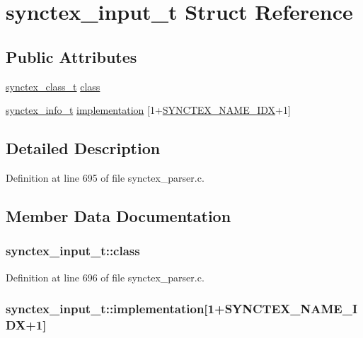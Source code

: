 \hypertarget{structsynctex__input__t}{\section{synctex\+\_\+input\+\_\+t Struct Reference}
\label{structsynctex__input__t}
}
\subsection*{Public Attributes}
\begin{DoxyCompactItemize}
\item 
\hyperlink{synctex__parser_8c_a68d11a2cb22716e7abd35cffed7d54c5}{synctex\+\_\+class\+\_\+t} \hyperlink{structsynctex__input__t_afb79142608b579e92c9c1e86c4852367}{class}
\item 
\hyperlink{synctex__parser_8c_a864f981cdab43a24765efb685074cf70}{synctex\+\_\+info\+\_\+t} \hyperlink{structsynctex__input__t_a4fc64d3f57219ff97fbeef1d7c646a28}{implementation} \mbox{[}1+\hyperlink{synctex__parser_8c_aaee635711c42e9eed742ef1155514c59}{S\+Y\+N\+C\+T\+E\+X\+\_\+\+N\+A\+M\+E\+\_\+\+I\+D\+X}+1\mbox{]}
\end{DoxyCompactItemize}


\subsection{Detailed Description}


Definition at line 695 of file synctex\+\_\+parser.\+c.



\subsection{Member Data Documentation}
\hypertarget{structsynctex__input__t_afb79142608b579e92c9c1e86c4852367}{
\subsubsection[{class}]{ synctex\+\_\+input\+\_\+t\+::class}}\label{structsynctex__input__t_afb79142608b579e92c9c1e86c4852367}


Definition at line 696 of file synctex\+\_\+parser.\+c.

\hypertarget{structsynctex__input__t_a4fc64d3f57219ff97fbeef1d7c646a28}{
\subsubsection[{implementation}]{ synctex\+\_\+input\+\_\+t\+::implementation\mbox{[}1+{\bf S\+Y\+N\+C\+T\+E\+X\+\_\+\+N\+A\+M\+E\+\_\+\+I\+D\+X}+1\mbox{]}}}\label{structsynctex__input__t_a4fc64d3f57219ff97fbeef1d7c646a28}


